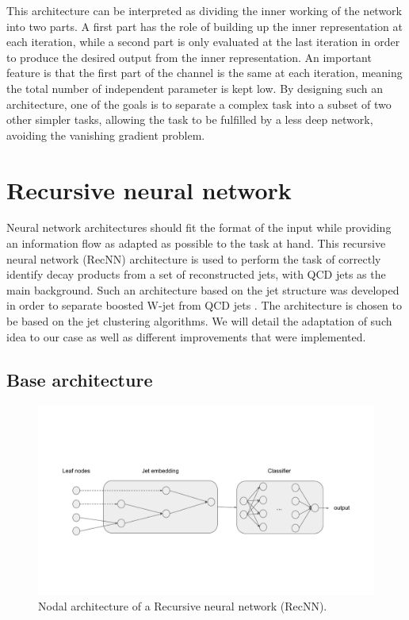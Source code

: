 This architecture can be interpreted as dividing the inner working of the network into two parts. A first part has the role of building up the inner representation at each iteration, while a second part is only evaluated at the last iteration in order to produce the desired output from the inner representation. An important feature is that the first part of the channel is the same at each iteration, meaning the total number of independent parameter is kept low. By designing such an architecture, one of the goals is to separate a complex task into a subset of two other simpler tasks, allowing the task to be fulfilled by a less deep network, avoiding the vanishing gradient problem.

\section{Recursive neural network}
\label{sec:RecNN}
Neural network architectures should fit the format of the input while providing an information flow as adapted as possible to the task at hand. This recursive neural network (RecNN) architecture is used to perform the task of correctly identify \tauh decay products from a set of reconstructed jets, with QCD jets as the main background. Such an architecture based on the jet structure was developed in order to separate boosted W-jet from QCD jets \cite{Louppe:2017ipp}. The architecture is chosen to be based on the jet clustering algorithms. We will detail the adaptation of such idea to our case as well as different improvements that were implemented.

\subsection{Base architecture}

\begin{figure}
    \centering
    \includegraphics[width=\textwidth]{Images/RecNNdiagram.pdf}
    \caption{Nodal architecture of a Recursive neural network (RecNN).}
    \label{fig:recnn_architecture}
\end{figure}

